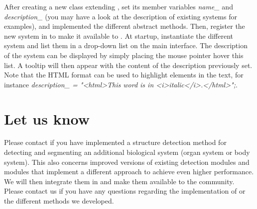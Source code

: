 After creating a new class extending \WJSystem, set its member variables \emph{name\_} and \emph{description\_} (you may have a look at the description of existing systems for examples), and implemented the different abstract methods. Then, register the new system in \WJSystemManager to make it available to \wingj. At startup, \wingj instantiate the different system and list them in a drop-down list on the main interface. The description of the system can be displayed by simply placing the mouse pointer hover this list. A tooltip will then appear with the content of the description previously set. Note that the HTML format can be used to highlight elements in the text, for instance \emph{description\_ = "\textless html\textgreater This word is in \textless i\textgreater italic\textless /i\textgreater.\textless /html\textgreater";}.

\section{Let us know}
Please contact if you have implemented a structure detection method for detecting and segmenting an additional biological system (organ system or body system). This also concerns improved versions of existing detection modules and modules that implement a different approach to achieve even higher performance. We will then integrate them in \wingj and make them available to the community. Please contact us if you have any questions regarding the implementation of \wingj or the different methods we developed.